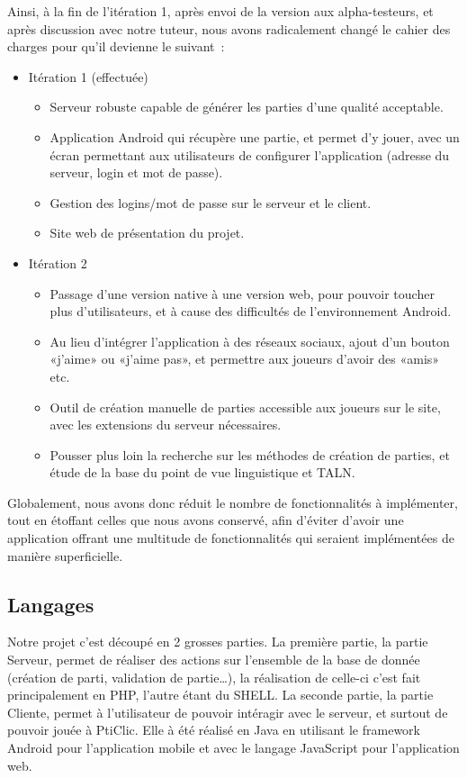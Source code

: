 \documentclass[a4paper,11pt,french]{article}
\def\android{Android\texttrademark{}}
\begin{document}
Ainsi, à la fin de l'itération 1, après envoi de la version aux alpha-testeurs, et après discussion avec notre tuteur, nous avons
radicalement changé le cahier des charges pour qu'il devienne le suivant~:
\begin{itemize}
\item Itération 1 (effectuée)
  \begin{itemize}
  \item Serveur robuste capable de générer les parties d'une qualité acceptable.
  \item Application \android{} qui récupère une partie, et permet d'y jouer, avec un écran permettant aux utilisateurs de configurer
    l'application (adresse du serveur, login et mot de passe).
  \item Gestion des logins/mot de passe sur le serveur et le client.
  \item Site web de présentation du projet.
  \end{itemize}
\item Itération 2
  \begin{itemize}
  \item Passage d'une version native à une version web, pour pouvoir toucher plus d'utilisateurs, et à cause des difficultés de l'environnement Android.
  \item Au lieu d'intégrer l'application à des réseaux sociaux, ajout d'un bouton «j'aime» ou «j'aime pas», et permettre aux joueurs d'avoir des «amis» etc.
  \item Outil de création manuelle de parties accessible aux joueurs sur le site, avec les extensions du serveur nécessaires.
  \item Pousser plus loin la recherche sur les méthodes de création de parties, et étude de la base du point de vue linguistique et TALN.
  \end{itemize}
\end{itemize}

Globalement, nous avons donc réduit le nombre de fonctionnalités à implémenter, tout en étoffant celles que nous avons conservé, afin
d'éviter d'avoir une application offrant une multitude de fonctionnalités qui seraient implémentées de manière superficielle.

\subsection{Langages}
Notre projet c'est découpé en 2 grosses parties. La première partie, la \og{}partie Serveur\fg{}, permet de réaliser des actions sur l'ensemble de la base de donnée (création de parti, validation de partie\ldots),
la réalisation de celle-ci c'est fait principalement en PHP, l'autre étant du SHELL.
La seconde partie, la \og{}partie Cliente\fg{}, permet à l'utilisateur de pouvoir intéragir avec le serveur, et surtout de pouvoir jouée à PtiClic. Elle à été réalisé en Java en utilisant le framework \android{} pour l'application mobile et avec le langage JavaScript pour l'application web.
\end{document}
